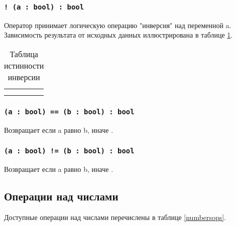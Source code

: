 \subsubsection{\lstinline|! (a : bool) : bool|}

Оператор принимает логическую операцию "инверсия" над переменной a. Зависимость результата от исходных данных иллюстрирована в таблице \ref{invtable}.

\begin{table}[htb]
	\caption{Таблица истинности инверсии}
	\label{invtable}
	\begin{tabular}{|c|c|}
		\hline
		\code{a} & \code{!a} \\ \hline
		\false{} & \true{} 	 \\ \hline
		\true{}  & \false{}  \\ \hline
	\end{tabular}
	\vspace{-2em}
\end{table}

\subsubsection{\lstinline|(a : bool) == (b : bool) : bool|}

Возвращает \true{} если a равно b, иначе \false{}.

\subsubsection{\lstinline|(a : bool) != (b : bool) : bool|}

Возвращает \true{} если a равно b, иначе \false{}.

\subsection{Операции над числами}

Доступные операции над числами перечислены в таблице \ref{numbersops}.


